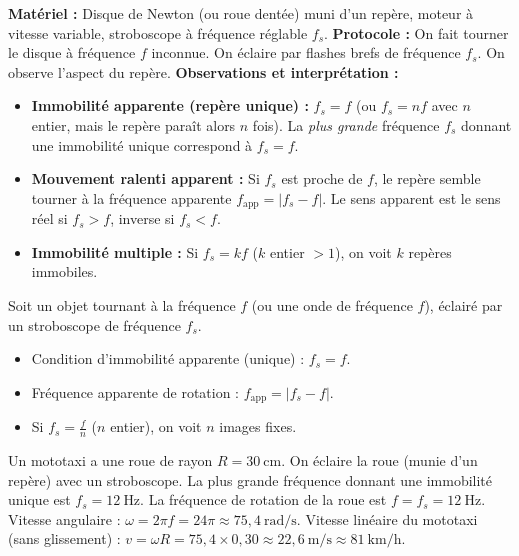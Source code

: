 \documentclass[11pt]{article}
\begin{document}
\begin{experience}
\textbf{Matériel :} Disque de Newton (ou roue dentée) muni d'un repère, moteur à vitesse variable, stroboscope à fréquence réglable $f_s$.
\textbf{Protocole :} On fait tourner le disque à fréquence $f$ inconnue. On éclaire par flashes brefs de fréquence $f_s$. On observe l'aspect du repère.
\textbf{Observations et interprétation :}
\begin{itemize}
    \item \textbf{Immobilité apparente (repère unique) :} $f_s = f$ (ou $f_s = nf$ avec $n$ entier, mais le repère paraît alors $n$ fois). La \emph{plus grande} fréquence $f_s$ donnant une immobilité unique correspond à $f_s = f$.
    \item \textbf{Mouvement ralenti apparent :} Si $f_s$ est proche de $f$, le repère semble tourner à la fréquence apparente $f_{\text{app}} = |f_s - f|$. Le sens apparent est le sens réel si $f_s > f$, inverse si $f_s < f$.
    \item \textbf{Immobilité multiple :} Si $f_s = k f$ ($k$ entier $>1$), on voit $k$ repères immobiles.
\end{itemize}
\end{experience}

\begin{propriete}
Soit un objet tournant à la fréquence $f$ (ou une onde de fréquence $f$), éclairé par un stroboscope de fréquence $f_s$.
\begin{itemize}
    \item Condition d'immobilité apparente (unique) : $f_s = f$.
    \item Fréquence apparente de rotation : $f_{\text{app}} = |f_s - f|$.
    \item Si $f_s = \frac{f}{n}$ ($n$ entier), on voit $n$ images fixes.
\end{itemize}
\end{propriete}

\begin{exoresolu}
Un mototaxi a une roue de rayon $R = 30\ \text{cm}$. On éclaire la roue (munie d'un repère) avec un stroboscope. La plus grande fréquence donnant une immobilité unique est $f_s = 12\ \text{Hz}$.
\tcblower
La fréquence de rotation de la roue est $f = f_s = 12\ \text{Hz}$.
Vitesse angulaire : $\omega = 2\pi f = 24\pi \approx 75,4\ \text{rad/s}$.
Vitesse linéaire du mototaxi (sans glissement) : $v = \omega R = 75,4 \times 0,30 \approx 22,6\ \text{m/s} \approx 81\ \text{km/h}$.
\end{exoresolu}
\end{document}
